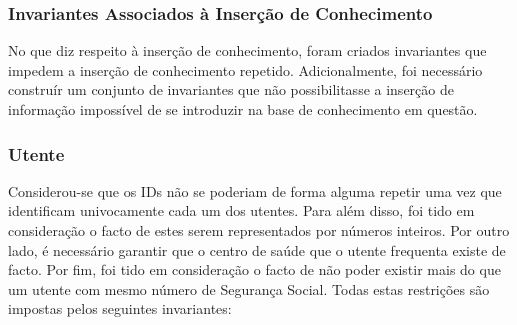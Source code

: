 \subsubsection{Invariantes Associados à Inserção de Conhecimento}

No que diz respeito à inserção de conhecimento, foram criados invariantes que impedem a 
inserção de conhecimento repetido.
Adicionalmente, foi necessário construír um conjunto de invariantes que não possibilitasse a 
inserção de informação impossível
de se introduzir na base de conhecimento em questão.

\subsubsection*{Utente}
Considerou-se que os IDs não se poderiam de forma alguma repetir uma vez que identificam 
univocamente cada um dos utentes.
Para além disso, foi tido em consideração o facto de estes serem representados por números 
inteiros. Por outro lado, é
necessário garantir que o centro de saúde que o utente frequenta existe de facto. Por fim, foi 
tido em consideração o facto
de não poder existir mais do que um utente com mesmo número de Segurança Social. Todas estas 
restrições são impostas
pelos seguintes invariantes:

\

